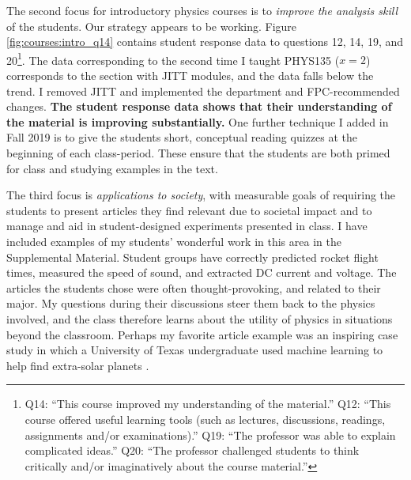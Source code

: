 \documentclass[../../main.tex]{subfiles}
\begin{document}
The second focus for introductory physics courses is to \textit{improve the analysis skill} of the students.  Our strategy appears to be working.  Figure \ref{fig:courses:intro_q14} contains student response data to questions 12, 14, 19, and 20\footnote{Q14: ``This course improved my understanding of the material.'' Q12: ``This course offered useful learning tools (such as lectures, discussions, readings, assignments and/or examinations).'' Q19: ``The professor was able to explain complicated ideas.'' Q20: ``The professor challenged students to think critically and/or imaginatively about the course material.''}.  The data corresponding to the second time I taught PHYS135 ($x = 2$) corresponds to the section with JITT modules, and the data falls below the trend.  I removed JITT and implemented the department and FPC-recommended changes.  \textbf{The student response data shows that their understanding of the material is improving substantially.}  One further technique I added in Fall 2019 is to give the students short, conceptual reading quizzes at the beginning of each class-period.  These ensure that the students are both primed for class and studying examples in the text.  \\ \hspace{0.1cm}

The third focus is \textit{applications to society}, with measurable goals of requiring the students to present articles they find relevant due to societal impact and to manage and aid in student-designed experiments presented in class.  I have included examples of my students' wonderful work in this area in the Supplemental Material.  Student groups have correctly predicted rocket flight times, measured the speed of sound, and extracted DC current and voltage.  The articles the students chose were often thought-provoking, and related to their major.  My questions during their discussions steer them back to the physics involved, and the class therefore learns about the utility of physics in situations beyond the classroom.  Perhaps my favorite article example was an inspiring case study in which a University of Texas undergraduate used machine learning to help find extra-solar planets \cite{texas}. \\ \hspace{0.1cm}
\end{document}
